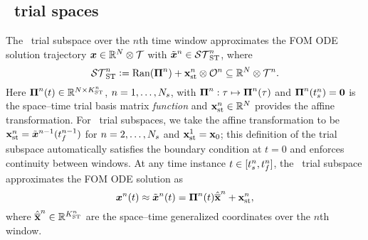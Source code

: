 \subsection{\spaceTimeAcronym\ trial spaces}\label{sec:wls_spacetime}

The \spaceTimeAcronym\ trial subspace over the $n$th time window approximates
the FOM ODE solution trajectory ${\boldsymbol x}\in\mathbb{R}^{N}\otimes\mathcal{T}$
with $\tilde{\boldsymbol x}^{n} \in \mathcal{ ST }_{\text{ST}}^{n}$, where
\begin{equation}\label{eq:st_sttrialspace}
 \mathcal{ ST }_{\text{ST}}^{n} \vcentcolon=
 \mathrm{Ran}(\boldsymbol \Pi^{n}) + \mathbf{x}_\text{st}^{n}\otimes \mathcal{O}^{n} \subseteq \mathbb{R}^{N} \otimes \mathcal{T}^{n}.
\end{equation}
Here $\boldsymbol \Pi^{n}(t) \in \mathbb{R}^{N \times K_{\text{ST}}^{n}}$, $n=1,\ldots,N_s$, with $\boldsymbol \Pi^{n}: \tau \mapsto \boldsymbol \Pi^{n}(\tau)$ and $\boldsymbol \Pi^{n}(t_s^{n}) = \boldsymbol 0$ is the space--time trial basis matrix \textit{function} and $\mathbf{x}_\text{st}^{n} \in \mathbb{R}^{N}$ provides the affine transformation. 
For \spaceTimeAcronym\ trial subspaces, we take the affine transformation to be $\mathbf{x}_\text{st}^{n} = \tilde{\boldsymbol x}^{n-1}(t_f^{n-1})$ for $n=2,\ldots,N_s$ and $\mathbf{x}_\text{st}^{1} = {{\mathbf{x}}_0}$; this definition of the trial subspace automatically satisfies the boundary condition at $t=0$ and enforces continuity between windows.
At any time instance $t \in [t_s^{n},t_f^{n}]$, the \spaceTimeAcronym\ trial subspace approximates the FOM ODE solution as
 \begin{equation}\label{eq:stapprox}
 {\boldsymbol x}^{n}(t) \approx \tilde{\boldsymbol x}^{n}(t)  = \boldsymbol \Pi^{n}(t) \hat{\mathbf{\overline{x}}}^{n} + \mathbf{x}_\text{st}^{n},
\end{equation}
where $\hat{\mathbf{\overline{x}}}^{n} \in \mathbb{R}^{K_{\text{ST}}^{n}}$ are the space--time generalized coordinates over the $n$th window. 
